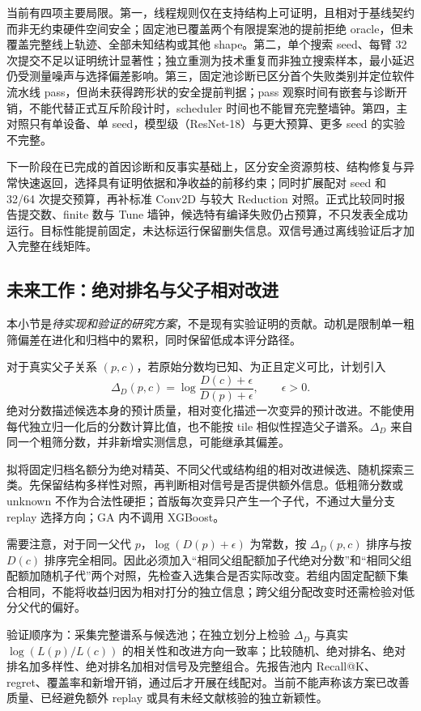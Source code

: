\documentclass[11pt,twocolumn]{ctexart}
\begin{document}
当前有四项主要局限。第一，线程规则仅在支持结构上可证明，且相对于基线契约而非无约束硬件空间安全；固定池已覆盖两个有限提案池的提前拒绝 oracle，但未覆盖完整线上轨迹、全部未知结构或其他 shape。第二，单个搜索 seed、每臂 32 次提交不足以证明统计显著性；独立重测为技术重复而非独立搜索样本，最小延迟仍受测量噪声与选择偏差影响。第三，固定池诊断已区分首个失败类别并定位软件流水线 pass，但尚未获得跨形状的安全提前判据；pass 观察时间有嵌套与诊断开销，不能代替正式互斥阶段计时，scheduler 时间也不能冒充完整墙钟。第四，主对照只有单设备、单 seed，模型级（ResNet-18）与更大预算、更多 seed 的实验不完整。

下一阶段在已完成的首因诊断和反事实基础上，区分安全资源剪枝、结构修复与异常快速返回，选择具有证明依据和净收益的前移约束；同时扩展配对 seed 和 32/64 次提交预算，再补标准 Conv2D 与较大 Reduction 对照。正式比较同时报告提交数、finite 数与 Tune 墙钟，候选特有编译失败仍占预算，不只发表全成功运行。目标性能提前固定，未达标运行保留删失信息。双信号通过离线验证后才加入完整在线矩阵。

\subsection{未来工作：绝对排名与父子相对改进}
\label{sec:hypothesis}
本小节是\emph{待实现和验证的研究方案}，不是现有实验证明的贡献。动机是限制单一粗筛偏差在进化和归档中的累积，同时保留低成本评分路径。

对于真实父子关系 $(p,c)$，若原始分数均已知、为正且定义可比，计划引入
\begin{equation}
\Delta_D(p,c)=\log\frac{D(c)+\epsilon}{D(p)+\epsilon},\qquad \epsilon>0.
\end{equation}
绝对分数描述候选本身的预计质量，相对变化描述一次变异的预计改进。不能使用每代独立归一化后的分数计算比值，也不能按 tile 相似性捏造父子谱系。$\Delta_D$ 来自同一个粗筛分数，并非新增实测信息，可能继承其偏差。

拟将固定归档名额分为绝对精英、不同父代或结构组的相对改进候选、随机探索三类。先保留结构多样性对照，再判断相对信号是否提供额外信息。低粗筛分数或 unknown 不作为合法性硬拒；首版每次变异只产生一个子代，不通过大量分支 replay 选择方向；GA 内不调用 XGBoost。

需要注意，对于同一父代 $p$，$\log(D(p)+\epsilon)$ 为常数，按 $\Delta_D(p,c)$ 排序与按 $D(c)$ 排序完全相同。因此必须加入“相同父组配额加子代绝对分数”和“相同父组配额加随机子代”两个对照，先检查入选集合是否实际改变。若组内固定配额下集合相同，不能将收益归因为相对打分的独立信息；跨父组分配改变时还需检验对低分父代的偏好。

验证顺序为：采集完整谱系与候选池；在独立划分上检验 $\Delta_D$ 与真实 $\log(L(p)/L(c))$ 的相关性和改进方向一致率；比较随机、绝对排名、绝对排名加多样性、绝对排名加相对信号及完整组合。先报告池内 Recall@K、regret、覆盖率和新增开销，通过后才开展在线配对。当前不能声称该方案已改善质量、已经避免额外 replay 或具有未经文献核验的独立新颖性。
\end{document}
